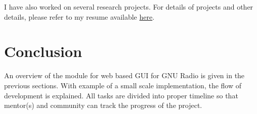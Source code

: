 \documentclass[a4paper, 11pt]{article}
\begin{document}
I have also worked on several research projects. For details of projects and other details, please refer to my resume available \href{http://kartikpatel.in/Backup/Documents/CV.pdf}{here}.

\section{Conclusion}
An overview of the module for web based GUI for GNU Radio is given in the previous sections. With example of a small scale implementation, the flow of development is explained. All tasks are divided into proper timeline so that mentor(s) and community can track the progress of the project.



\end{document}
